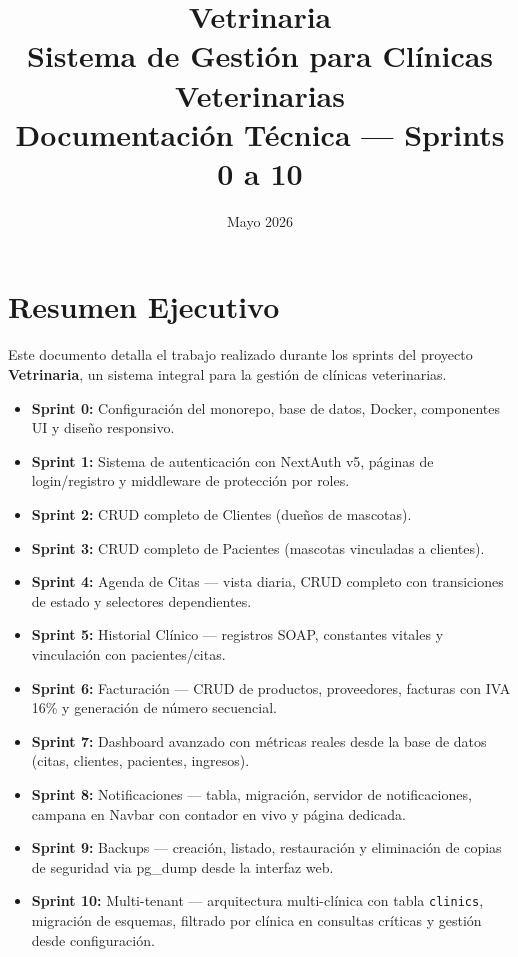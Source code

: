\documentclass[12pt,a4paper]{article}
\title{\vspace{-2cm}\textbf{Vetrinaria}\\[0.3cm]
\large Sistema de Gestión para Clínicas Veterinarias\\[0.5cm]
\textbf{Documentación Técnica — Sprints 0 a 10}}
\author{}
\date{Mayo 2026}
\begin{document}
\maketitle
\thispagestyle{empty}
\newpage

\tableofcontents
\newpage

\section{Resumen Ejecutivo}

Este documento detalla el trabajo realizado durante los sprints del
proyecto \textbf{Vetrinaria}, un sistema integral para la gestión de clínicas
veterinarias.

\begin{itemize}[leftmargin=*]
    \item \textbf{Sprint 0:} Configuración del monorepo, base de datos, Docker,
          componentes UI y diseño responsivo.
    \item \textbf{Sprint 1:} Sistema de autenticación con NextAuth v5, páginas de
          login/registro y middleware de protección por roles.
    \item \textbf{Sprint 2:} CRUD completo de Clientes (dueños de mascotas).
    \item \textbf{Sprint 3:} CRUD completo de Pacientes (mascotas vinculadas a clientes).
    \item \textbf{Sprint 4:} Agenda de Citas --- vista diaria, CRUD completo con
          transiciones de estado y selectores dependientes.
    \item \textbf{Sprint 5:} Historial Clínico --- registros SOAP, constantes
          vitales y vinculación con pacientes/citas.
    \item \textbf{Sprint 6:} Facturación --- CRUD de productos, proveedores, facturas
          con IVA 16\% y generación de número secuencial.
    \item \textbf{Sprint 7:} Dashboard avanzado con métricas reales desde la base
          de datos (citas, clientes, pacientes, ingresos).
    \item \textbf{Sprint 8:} Notificaciones --- tabla, migración, servidor de
          notificaciones, campana en Navbar con contador en vivo y página dedicada.
    \item \textbf{Sprint 9:} Backups --- creación, listado, restauración y
          eliminación de copias de seguridad via pg\_dump desde la interfaz web.
    \item \textbf{Sprint 10:} Multi-tenant --- arquitectura multi-clínica con
          tabla \texttt{clinics}, migración de esquemas, filtrado por clínica
          en consultas críticas y gestión desde configuración.
\end{itemize}
\end{document}
